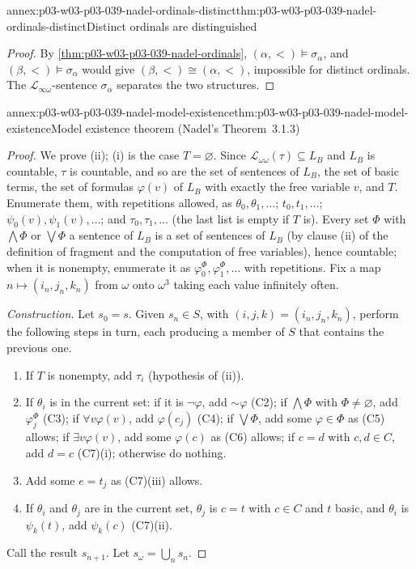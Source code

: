 \begin{annexitem}{annex:p03-w03-p03-039-nadel-ordinals-distinct}{thm:p03-w03-p03-039-nadel-ordinals-distinct}{Distinct ordinals are distinguished}
\begin{proof}
By \cref{thm:p03-w03-p03-039-nadel-ordinals}, \((\alpha,<)\models\sigma_\alpha\),
and \((\beta,<)\models\sigma_\alpha\) would give \((\beta,<)\cong(\alpha,<)\),
impossible for distinct ordinals. The \(\mathscr L_{\infty\omega}\)-sentence
\(\sigma_\alpha\) separates the two structures.
\end{proof}
\end{annexitem}

\begin{annexitem}{annex:p03-w03-p03-039-nadel-model-existence}{thm:p03-w03-p03-039-nadel-model-existence}{Model existence theorem (Nadel's Theorem~3.1.3)}
\begin{proof}
We prove (ii); (i) is the case \(T=\varnothing\). Since
\(\mathscr L_{\omega\omega}(\tau)\subseteq L_B\) and \(L_B\) is countable,
\(\tau\) is countable, and so are the set of sentences of \(L_B\), the set of
basic terms, the set of formulas \(\varphi(v)\) of \(L_B\) with exactly the
free variable \(v\), and \(T\). Enumerate them, with repetitions allowed, as
\(\theta_0,\theta_1,\dots\); \(t_0,t_1,\dots\); \(\psi_0(v),\psi_1(v),\dots\);
and \(\tau_0,\tau_1,\dots\) (the last list is empty if \(T\) is). Every set
\(\Phi\) with \(\bigwedge\Phi\) or \(\bigvee\Phi\) a sentence of \(L_B\) is a
set of sentences of \(L_B\) (by clause (ii) of the definition of fragment and
the computation of free variables), hence countable; when it is nonempty,
enumerate it as \(\varphi^\Phi_0,\varphi^\Phi_1,\dots\) with repetitions. Fix
a map \(n\mapsto(i_n,j_n,k_n)\) from \(\omega\) onto \(\omega^3\) taking each
value infinitely often.

\emph{Construction.} Let \(s_0=s\). Given \(s_n\in S\), with
\((i,j,k)=(i_n,j_n,k_n)\), perform the following steps in turn, each
producing a member of \(S\) that contains the previous one.
\begin{enumerate}
\item[(a)] If \(T\) is nonempty, add \(\tau_i\) (hypothesis of (ii)).
\item[(b)] If \(\theta_i\) is in the current set: if it is \(\neg\varphi\),
      add \({\sim}\varphi\) (C2); if \(\bigwedge\Phi\) with \(\Phi\ne\varnothing\),
      add \(\varphi^\Phi_j\) (C3); if \(\forall v\varphi(v)\), add
      \(\varphi(c_j)\) (C4); if \(\bigvee\Phi\), add some \(\varphi\in\Phi\)
      as (C5) allows; if \(\exists v\varphi(v)\), add some \(\varphi(c)\) as
      (C6) allows; if \(c=d\) with \(c,d\in C\), add \(d=c\) (C7)(i);
      otherwise do nothing.
\item[(c)] Add some \(e=t_j\) as (C7)(iii) allows.
\item[(d)] If \(\theta_i\) and \(\theta_j\) are in the current set, \(\theta_j\)
      is \(c=t\) with \(c\in C\) and \(t\) basic, and \(\theta_i\) is
      \(\psi_k(t)\), add \(\psi_k(c)\) (C7)(ii).
\end{enumerate}
Call the result \(s_{n+1}\). Let \(s_\omega=\bigcup_ns_n\).


\end{proof}
\end{annexitem}
